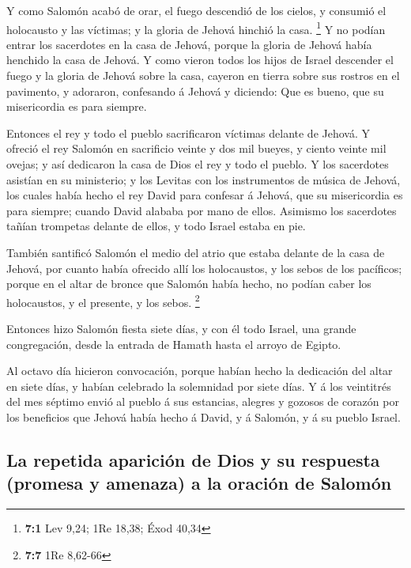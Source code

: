  Y como Salomón acabó de orar, el fuego descendió de los
cielos, y consumió el holocausto y las víctimas; y la gloria de Jehová
hinchió la casa. \footnote{\textbf{7:1} Lev 9,24; 1Re 18,38; Éxod 40,34}
 Y no podían entrar los sacerdotes en la casa de Jehová,
porque la gloria de Jehová había henchido la casa de Jehová.
 Y como vieron todos los hijos de Israel descender el fuego
y la gloria de Jehová sobre la casa, cayeron en tierra sobre sus rostros
en el pavimento, y adoraron, confesando á Jehová y diciendo: Que es
bueno, que su misericordia es para siempre.

 Entonces el rey y todo el pueblo sacrificaron víctimas
delante de Jehová.  Y ofreció el rey Salomón en sacrificio
veinte y dos mil bueyes, y ciento veinte mil ovejas; y así dedicaron la
casa de Dios el rey y todo el pueblo.  Y los sacerdotes
asistían en su ministerio; y los Levitas con los instrumentos de música
de Jehová, los cuales había hecho el rey David para confesar á Jehová,
que su misericordia es para siempre; cuando David alababa por mano de
ellos. Asimismo los sacerdotes tañían trompetas delante de ellos, y todo
Israel estaba en pie.

 También santificó Salomón el medio del atrio que estaba
delante de la casa de Jehová, por cuanto había ofrecido allí los
holocaustos, y los sebos de los pacíficos; porque en el altar de bronce
que Salomón había hecho, no podían caber los holocaustos, y el presente,
y los sebos. \footnote{\textbf{7:7} 1Re 8,62-66}

 Entonces hizo Salomón fiesta siete días, y con él todo
Israel, una grande congregación, desde la entrada de Hamath hasta el
arroyo de Egipto.

 Al octavo día hicieron convocación, porque habían hecho la
dedicación del altar en siete días, y habían celebrado la solemnidad por
siete días.  Y á los veintitrés del mes séptimo envió al
pueblo á sus estancias, alegres y gozosos de corazón por los beneficios
que Jehová había hecho á David, y á Salomón, y á su pueblo Israel.

\hypertarget{la-repetida-apariciuxf3n-de-dios-y-su-respuesta-promesa-y-amenaza-a-la-oraciuxf3n-de-salomuxf3n}{%
\subsection{La repetida aparición de Dios y su respuesta (promesa y
amenaza) a la oración de
Salomón}\label{la-repetida-apariciuxf3n-de-dios-y-su-respuesta-promesa-y-amenaza-a-la-oraciuxf3n-de-salomuxf3n}}

